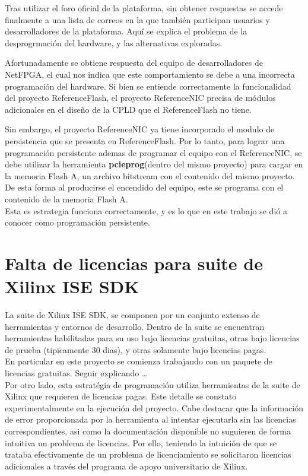 Tras utilizar el foro oficial de la plataforma, sin obtener respuestas se accede finalmente a una lista de correos en la que tambi\'en participan usuarios y desarrolladores de la plataforma. Aquí se explica el problema de la desprogrmaci\'on del hardware, y las alternativas exploradas. 

Afortunadamente se obtiene respuesta del equipo de desarrolladores de NetFPGA, el cual nos indica que este comportamiento se debe a una incorrecta programaci\'on del hardware. Si bien se entiende correctamente la funcionalidad del proyecto ReferenceFlash, el proyecto ReferenceNIC precisa de módulos adicionales en el diseño de la CPLD que el ReferenceFlash no tiene. 

Sin embargo, el proyecto ReferenceNIC ya tiene incorporado el modulo de persistencia que se presenta en ReferenceFlash. Por lo tanto, para lograr una programaci\'on persistente ademas de programar el equipo con el ReferenceNIC, se debe utilizar la herramienta \textbf{pcieprog}(dentro del mismo proyecto) para cargar en la memoria Flash A, un archivo bitstream con el contenido del mismo proyecto. De esta forma al producirse el encendido del equipo, este se programa con el contenido de la memoria Flash A.\\ 

Esta es estrategia funciona correctamente, y es lo que en este trabajo se di\'o a conocer como programación persistente.

\section{Falta de licencias para suite de Xilinx ISE SDK}
\label{apendiceB3}

La suite de Xilinx ISE SDK, se componen por un conjunto extenso de herramientas y entornos de desarrollo. Dentro de la suite se encuentran herramientas habilitadas para su uso bajo licencias gratuitas, otras bajo licencias de prueba (tipicamente 30 dias), y otras solamente bajo licencias pagas.\\

En particular en este proyecto se comienza trabajando con un paquete de licencias gratuitas. Seguir explicando \dots\\

Por otro lado, esta estrat\'egia de programaci\'on utiliza herramientas de la suite de Xilinx que requieren de licencias pagas. Este detalle se constato experimentalmente en la ejecuci\'on del proyecto. Cabe destacar que la informaci\'on de error proporcionada por la herramienta al intentar ejecutarla sin las licencias correspondientes, asi como la documentaci\'on disponible no suguieren de forma intuitiva un problema de licencias. Por ello, teniendo la intuici\'on de que se trataba efectivamente de un problema de licenciamiento se solicitaron licencias adicionales a trav\'es del programa de apoyo universitario de Xilinx.

